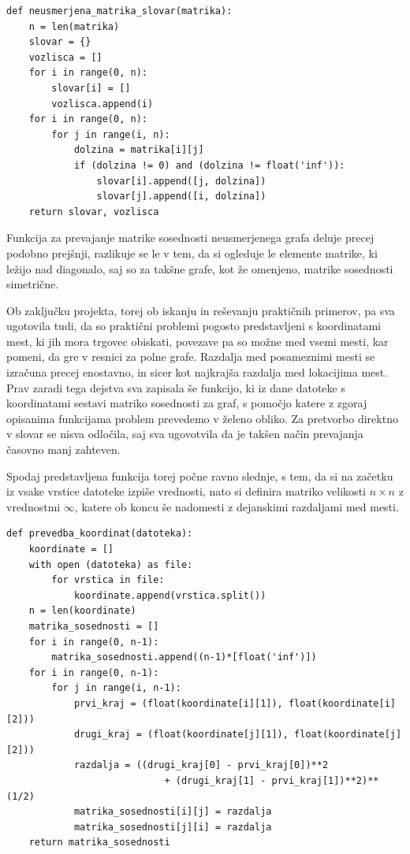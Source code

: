 \documentclass[10pt, a4paper]{article}
\begin{document}
\begin{verbatim}
def neusmerjena_matrika_slovar(matrika):
    n = len(matrika)
    slovar = {}
    vozlisca = []
    for i in range(0, n):
        slovar[i] = []
        vozlisca.append(i)
    for i in range(0, n):
        for j in range(i, n):
            dolzina = matrika[i][j]
            if (dolzina != 0) and (dolzina != float('inf')):
                slovar[i].append([j, dolzina])
                slovar[j].append([i, dolzina])
    return slovar, vozlisca
\end{verbatim}

Funkcija za prevajanje matrike sosednosti neusmerjenega grafa deluje precej podobno prejšnji, razlikuje se le v tem, da si ogleduje le elemente matrike, ki ležijo nad diagonalo, saj so za takšne grafe, kot že omenjeno, matrike sosednosti simetrične.

\bigskip

Ob zaključku projekta, torej ob iskanju in reševanju praktičnih primerov, pa sva ugotovila tudi, da so praktični problemi pogosto predstavljeni s koordinatami mest, ki jih mora trgovec obiskati, povezave pa so možne med vsemi mesti, kar pomeni, da gre v resnici za polne grafe. Razdalja med posameznimi mesti se izračuna precej enostavno, in sicer kot najkrajša razdalja med lokacijima mest. Prav zaradi tega dejstva sva zapisala še funkcijo, ki iz dane datoteke s koordinatami sestavi matriko sosednosti za graf, s pomočjo katere z zgoraj opisanima funkcijama problem prevedemo v želeno obliko. Za pretvorbo direktno v slovar se nisva odločila, saj sva ugovotvila da je takšen način prevajanja časovno manj zahteven.

\bigskip
Spodaj predstavljena funkcija torej počne ravno slednje, s tem, da si na začetku iz vsake vrstice datoteke izpiše vrednosti, nato si definira matriko velikosti $n \times n$ z vrednostmi $\infty$, katere ob koncu še nadomesti z dejanskimi razdaljami med mesti.

\newpage

\begin{verbatim}
def prevedba_koordinat(datoteka):
    koordinate = []
    with open (datoteka) as file:
        for vrstica in file:
            koordinate.append(vrstica.split())
    n = len(koordinate)
    matrika_sosednosti = []
    for i in range(0, n-1):
        matrika_sosednosti.append((n-1)*[float('inf')])
    for i in range(0, n-1):
        for j in range(i, n-1):
            prvi_kraj = (float(koordinate[i][1]), float(koordinate[i][2]))
            drugi_kraj = (float(koordinate[j][1]), float(koordinate[j][2]))
            razdalja = ((drugi_kraj[0] - prvi_kraj[0])**2 
	                        + (drugi_kraj[1] - prvi_kraj[1])**2)**(1/2)
            matrika_sosednosti[i][j] = razdalja
            matrika_sosednosti[j][i] = razdalja
    return matrika_sosednosti
\end{verbatim}
\end{document}

